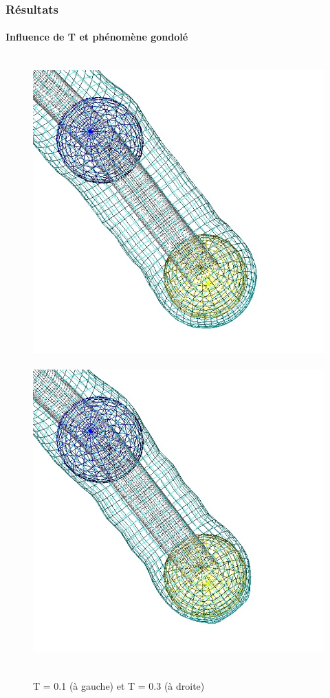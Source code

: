 \documentclass[9pt]{beamer}
\begin{document}
\begin{frame}
	\frametitle{Résultats}
	\framesubtitle{Influence de T et phénomène gondolé}
	
	\begin{figure}[H]
		\centering
		\leavevmode
  		\hbox{
  			\includegraphics[scale=0.3]{images/evolution_t01.jpg}
  			\hspace*{0.5cm} 
     		\includegraphics[scale=0.3]{images/evolution_t03.jpg}
     		\hspace*{0.5cm}  
  		}
  		\caption{T = 0.1 (à gauche) et T = 0.3 (à droite)}
	\end{figure}
\end{frame}
\end{document}
